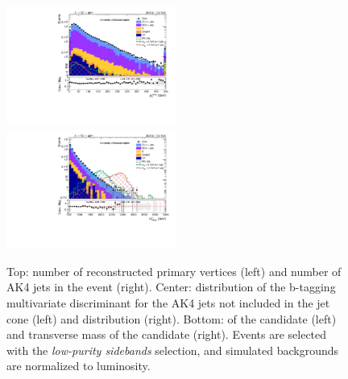 \begin{figure}[!htb]
\begin{center}
    \includegraphics[width=0.495\textwidth]{plots/v9_thesis/XVZnnlpSB/X_pt.pdf}
    \includegraphics[width=0.495\textwidth]{plots/v9_thesis/XVZnnlpSB/X_tmass.pdf}

    \caption{Top: number of reconstructed primary vertices (left) and number of AK4 jets in the event (right). Center: distribution of the b-tagging multivariate discriminant for the AK4 jets not included in the \V jet cone (left) and \MET distribution (right). Bottom: \pt of the \VZ candidate (left) and transverse mass of the \VZ candidate (right). Events are selected with the \emph{low-purity sidebands} selection, and simulated backgrounds are normalized to luminosity.}
  \end{center}
\end{figure}

\clearpage



